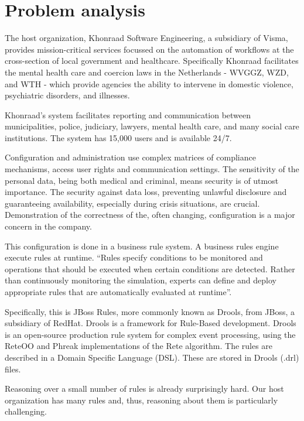 \section{Problem analysis}

The host organization, Khonraad Software Engineering, a subsidiary of Visma, provides mission-critical services focussed on the automation of workflows at the cross-section of local government and healthcare.
Specifically Khonraad facilitates the mental health care and coercion laws in the Netherlands - WVGGZ, WZD, and WTH - which provide agencies the ability to intervene in domestic violence, psychiatric disorders, and illnesses.

Khonraad's system facilitates reporting and communication between municipalities, police, judiciary, lawyers, mental health care, and many social care institutions.
The system has 15,000 users and is available 24/7. 

Configuration and administration use complex matrices of compliance mechanisms, access user rights and communication settings.
The sensitivity of the personal data, being both medical and criminal, means security is of utmost importance.
The security against data loss, preventing unlawful disclosure and guaranteeing availability, especially during crisis situations, are crucial.
Demonstration of the correctness of the, often changing, configuration is a major concern in the company. 

This configuration is done in a business rule system. 
A business rules engine execute rules at runtime. 
``Rules specify conditions to be monitored and operations that should be executed when certain conditions are detected.
Rather than continuously monitoring the simulation, experts can define and deploy appropriate rules that are automatically evaluated at runtime''\cite{liu2003dios++}. 

Specifically, this is JBoss Rules, more commonly known as Drools, from JBoss, a subsidiary of RedHat\cite{browne2009jboss}.
Drools is a framework for Rule-Based development.
Drools is an open-source production rule system for complex event processing, using the ReteOO and Phreak implementations of the Rete algorithm\cite{forgy1989rete}.
The rules are described in a Domain Specific Language (DSL).
These are stored in Drools (.drl) files. 

Reasoning over a small number of rules is already surprisingly hard.
Our host organization has many rules and, thus, reasoning about them is particularly challenging.

